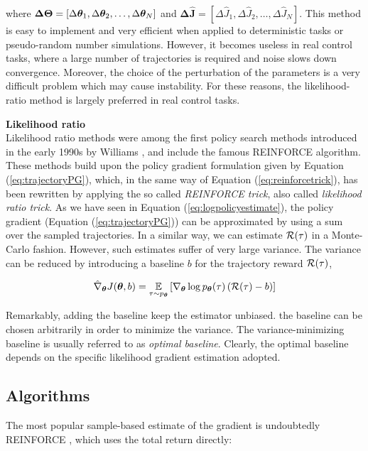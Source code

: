 where $\boldsymbol{\Delta\Theta}=[\Delta\boldsymbol{\theta}_1, \Delta\boldsymbol{\theta}_2, \dots, \Delta\boldsymbol{\theta}_N]$ and $\boldsymbol{\Delta\hat{J}}=[\Delta\hat{J}_1,\Delta\hat{J}_2,\dots,\Delta\hat{J}_N]$. This method
is easy to implement and very efficient when applied to deterministic tasks or pseudo-random number simulations. However, it becomes useless in real control tasks, where a large number of trajectories is required and noise slows down convergence. Moreover, the choice of the perturbation of the parameters is a very difficult problem which may cause instability. For these reasons, the likelihood-ratio method is largely preferred in real control tasks.

\textbf{Likelihood ratio}\\
Likelihood ratio methods were among the first policy search methods
introduced in the early 1990s by Williams \cite{williams1992simple}, and include the famous REINFORCE algorithm. These methods build upon the policy gradient formulation given by Equation (\ref{eq:trajectoryPG}), which, in the same way of Equation (\ref{eq:reinforcetrick}), has been rewritten by applying the so called \emph{REINFORCE trick}, also called \emph{likelihood ratio trick}. As we have seen in Equation (\ref{eq:logpolicyestimate}), the policy gradient (Equation (\ref{eq:trajectoryPG})) can be approximated by using a sum over the sampled trajectories. In a similar way, we can estimate $\mathcal{R}(\tau)$ in a Monte-Carlo fashion. However, such estimates suffer of very large variance. The variance can be reduced by introducing a baseline $b$ for the trajectory reward $\mathcal{R}(\tau)$, \ie

\begin{align}
\hat{\nabla}_{\boldsymbol{\theta}}J(\boldsymbol{\theta}, b) = \underset{\tau\sim p_{\boldsymbol{\theta}}}{\mathbb{E}}\left[{\nabla_{\boldsymbol{\theta}}\log p_{\boldsymbol{\theta}}(\tau)\left(\mathcal{R}(\tau)-b\right)}\right] \label{eq:PGbaseline}
\end{align}

Remarkably, adding the baseline keep the estimator unbiased. the baseline can be chosen arbitrarily in order to minimize the variance. The variance-minimizing baseline is usually referred to as \emph{optimal baseline}.  Clearly, the optimal baseline depends on the specific likelihood gradient estimation adopted.

\subsection{Algorithms}
The most popular sample-based estimate of the gradient is undoubtedly REINFORCE \cite{williams1992simple}, which uses the total return directly:

